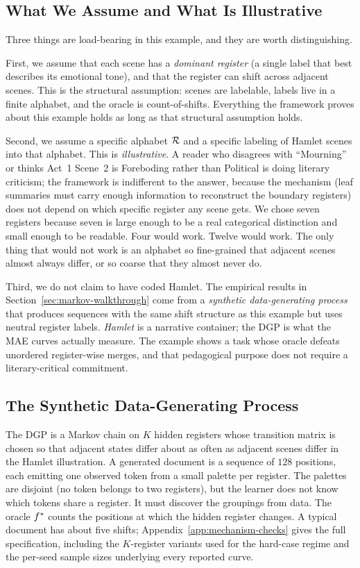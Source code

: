 \subsection{What We Assume and What Is Illustrative}\label{sec:scene-register-assumptions}

Three things are load-bearing in this example, and they are worth
distinguishing.

First, we assume that each scene has a \emph{dominant register} (a
single label that best describes its emotional tone), and that the
register can shift across adjacent scenes. This is the structural
assumption: scenes are labelable, labels live in a finite alphabet, and
the oracle is count-of-shifts. Everything the framework proves about
this example holds as long as that structural assumption holds.

Second, we assume a specific alphabet $\mathcal{R}$ and a specific labeling
of Hamlet scenes into that alphabet. This is \emph{illustrative}. A
reader who disagrees with ``Mourning'' or thinks Act~1 Scene~2 is
Foreboding rather than Political is doing literary criticism; the
framework is indifferent to the answer, because the mechanism (leaf
summaries must carry enough information to reconstruct the boundary
registers) does not depend on which specific register any scene gets.
We chose seven registers because seven is large enough to be a real
categorical distinction and small enough to be readable. Four would
work. Twelve would work. The only thing that would not work is an
alphabet so fine-grained that adjacent scenes almost always differ, or
so coarse that they almost never do.

Third, we do not claim to have coded Hamlet. The empirical results in
Section~\ref{sec:markov-walkthrough} come from a \emph{synthetic
data-generating process} that produces sequences with the same shift
structure as this example but uses neutral register labels.
\emph{Hamlet} is a narrative container; the DGP is what the MAE
curves actually measure. The example shows a task whose oracle defeats
unordered register-wise merges, and that pedagogical purpose does not
require a literary-critical commitment.

\subsection{The Synthetic Data-Generating Process}\label{sec:synthetic-dgp}

The DGP is a Markov chain on $K$ hidden registers whose transition
matrix is chosen so that adjacent states differ about as often as
adjacent scenes differ in the Hamlet illustration. A generated document
is a sequence of $128$ positions, each emitting one observed token from
a small palette per register. The palettes are disjoint (no token
belongs to two registers), but the learner does not know which tokens
share a register. It must discover the groupings from data. The oracle $f^\ast$ counts the positions at which the hidden
register changes. A typical document has about five shifts;
Appendix~\ref{app:mechanism-checks} gives the full specification,
including the $K$-register variants used for the hard-case regime and
the per-seed sample sizes underlying every reported curve.

